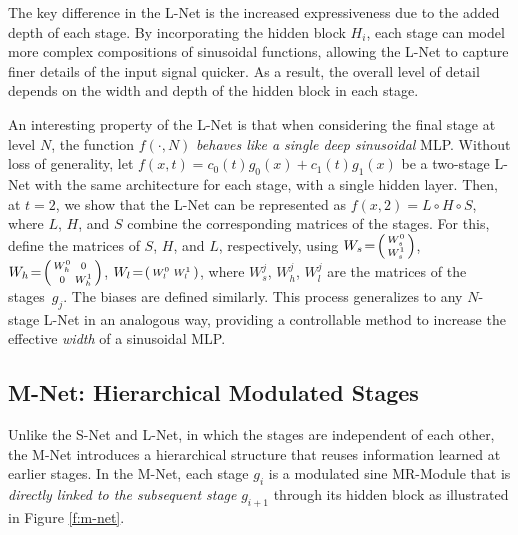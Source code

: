 The key difference in the L-Net is the increased expressiveness due to the added depth of each stage. By incorporating the hidden block \( H_i \), each stage can model more complex compositions of sinusoidal functions, allowing the L-Net to capture finer details of the input signal quicker. As a result, the overall level of detail depends on the width and depth of the hidden block in each stage. 

An interesting property of the L-Net is that when considering the final stage at level \( N \), the function \( f(\cdot, N) \) \textit{behaves like a single deep sinusoidal} MLP. Without loss of generality, let \( f(x, t) = c_0(t)g_0(x) + c_1(t)g_1(x) \) be a two-stage L-Net with the same architecture for each stage, with a single hidden layer. Then, at \( t = 2 \), we show that the L-Net can be represented as \( f(x, 2) = L \circ H \circ S \), where \( L \), \( H \), and \( S \) combine the corresponding matrices of the stages. For this, define the matrices of $S$, $H$, and $L$, respectively, using $W_s\!=\!\begin{psmallmatrix}W_s^0\\W_s^1\end{psmallmatrix}$, 
$W_h\!=\!\begin{psmallmatrix}W_h^0& 0\\0&W_h^1\end{psmallmatrix}$, 
$W_l\!=\!\begin{psmallmatrix}W_l^0 & W_l^1\end{psmallmatrix}$, where $W_s^j$, $W_h^j$, $W_l^j$ are the matrices of the stages~$g_j$. The biases are defined similarly. This process generalizes to any \( N \)-stage L-Net in an analogous way, providing a controllable method to increase the effective \textit{width} of a sinusoidal MLP.

\subsection{M-Net: Hierarchical Modulated Stages}
\label{s-mnet}

Unlike the S-Net and L-Net, in which the stages are independent of each other, the M-Net introduces a hierarchical structure that reuses information learned at earlier stages. In the M-Net, each stage \( g_i \) is a modulated sine MR-Module that is \textit{directly linked to the subsequent stage} \( g_{i+1} \) through its hidden block as illustrated in Figure \ref{f:m-net}.

